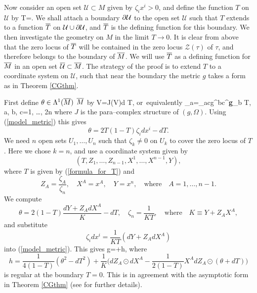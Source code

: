 Now consider an open set  ${\mathcal U}\subset M$ given
by  $\zeta_ix^i>0$, and define the function $T$ on ${\mathcal U}$ by
\be
\label{formula_for_T}
T=.
\ee
We shall attach a boundary  $\partial \mathcal{U}$ to the open set $\mathcal{U}$ 
such that $T$ extends to a function $\overline{T}$ on $\mathcal{U}\cup \partial \mathcal{U}$, and
$\overline{T}$ is  the defining function for this boundary.
We then investigate the geometry on $M$ in the limit $T\rightarrow 0$.
It is clear from above that
the zero locus of $\overline{T}$ will be contained in the zero locus $\mathcal{Z}(\tau)$ of $\tau$, and
therefore belongs to the boundary of $\overline{M}$. We will 
use $\overline{T}$ as a defining function for $\overline{M}$ in an open set $\overline{\mathcal{U}}\subset\overline{M}$.
The strategy of the proof is to extend $T$ to a coordinate system on 
$\mathcal{U}$, such that near the boundary the metric $g$ takes a form
as in Theorem \ref{CGthm}.


First define $\theta\in \Lambda^1(\overline{M})$ $\overline{M}$
by 
\be
\label{def_theta}
V\hook \theta=J(V)\hook d T, \quad\mbox{or equivalently}\quad 
\theta_a=\Omega_{ac}g^{bc}{{\nabla}^{\bf g}}_b T, \quad a, b, c=1, \dots, 2n
\ee
where $J$ is the para--complex structure of $(g,  \Omega)$. Using (\ref{model_metric}) this  gives
\[
\theta=2T(1-T)\zeta_id x^i-dT.
\]
We need $n$  open sets $U_1, \dots, U_n$ such that $\zeta_k\neq 0$ on $U_k$
to cover the zero locus of $T$. Here we chose $k=n$, and use
a coordinate system given by
\[
(T, Z_1, \dots, Z_{n-1}, X^1, \dots,
 X^{n-1}, Y),
\] 
where $T$ is
given by (\ref{formula_for_T}) and
\[
Z_A=\frac {\zeta_A}{\zeta_n}, \quad X^A=x^A, \quad Y=x^{n}, \quad\mbox{where}\quad
A=1, \dots, n-1.
\]
We compute
\[
\theta=2(1-T)\frac{dY+Z_AdX^A}{K}-dT, \quad
\zeta_n=\frac{1}{KT}, \quad \mbox{where}\quad K\equiv Y+Z_AX^A,
\]
and substitute
\[
\zeta_i dx^i=\frac{1}{KT}(dY+Z_AdX^A)
\]
into (\ref{model_metric}). This gives
\be
\label{CG_Form}
g=+h,
\ee
where 
\[
h=\frac{1}{4(1-T)}(\theta^2-dT^2)+\frac{1}{K}\Big(dZ_A\odot dX^A-\frac{1}{2(1-T)}X^A dZ_A\odot(\theta+dT)\Big)
\]
is regular at the boundary $T=0$. This is in agreement with the 
asymptotic form in Theorem \ref{CGthm} (see \cite{CG} for further details).

